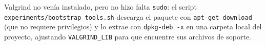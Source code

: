 Valgrind no venía instalado, pero no hizo falta \texttt{sudo}: el script \texttt{experiments/bootstrap\_tools.sh} descarga el paquete con \texttt{apt-get download} (que no requiere privilegios) y lo extrae con \texttt{dpkg-deb -x} en una carpeta local del proyecto, ajustando \texttt{VALGRIND\_LIB} para que encuentre sus archivos de soporte.
